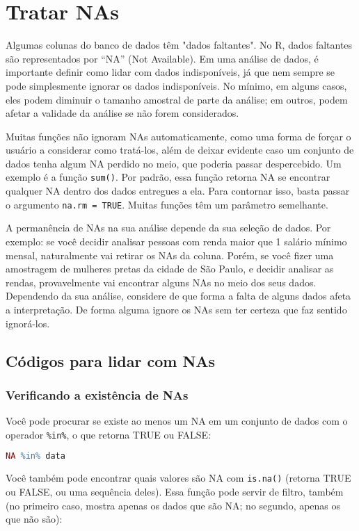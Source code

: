 \documentclass{book}
\begin{document}
\section{Tratar NAs}
Algumas colunas do banco de dados têm "dados faltantes". No R, dados faltantes são representados por ``NA'' (Not Available). Em uma análise de dados, é importante definir como lidar com dados indisponíveis, já que nem sempre se pode simplesmente ignorar os dados indisponíveis. No mínimo, em alguns casos, eles podem diminuir o tamanho amostral de parte da análise; em outros, podem afetar a validade da análise se não forem considerados.
\par
Muitas funções não ignoram NAs automaticamente, como uma forma de forçar o usuário a considerar como tratá-los, além de deixar evidente caso um conjunto de dados tenha algum NA perdido no meio, que poderia passar despercebido. Um exemplo é a função \texttt{sum()}. Por padrão, essa função retorna NA se encontrar qualquer NA dentro dos dados entregues a ela. Para contornar isso, basta passar o argumento \texttt{na.rm = TRUE}. Muitas funções têm um parâmetro semelhante.
\par
A permanência de NAs na sua análise depende da sua seleção de dados. Por exemplo: se você decidir analisar pessoas com renda maior que 1 salário mínimo mensal, naturalmente vai retirar os NAs da coluna. Porém, se você fizer uma amostragem de mulheres pretas da cidade de São Paulo, e decidir analisar as rendas, provavelmente vai encontrar alguns NAs no meio dos seus dados. Dependendo da sua análise, considere de que forma a falta de alguns dados afeta a interpretação. De forma alguma ignore os NAs sem ter certeza que faz sentido ignorá-los.

\subsection{Códigos para lidar com NAs}
\subsubsection{Verificando a existência de NAs}
Você pode procurar se existe ao menos um NA em um conjunto de dados com o operador \texttt{\%in\%}, o que retorna TRUE ou FALSE:

\lstset{style=ex1linha}
\begin{lstlisting}[language=R]
NA %in% data
\end{lstlisting}

Você também pode encontrar quais valores são NA com \texttt{is.na()} (retorna TRUE ou FALSE, ou uma sequência deles). Essa função pode servir de filtro, também (no primeiro caso, mostra apenas os dados que são NA; no segundo, apenas os que não são):
\end{document}
